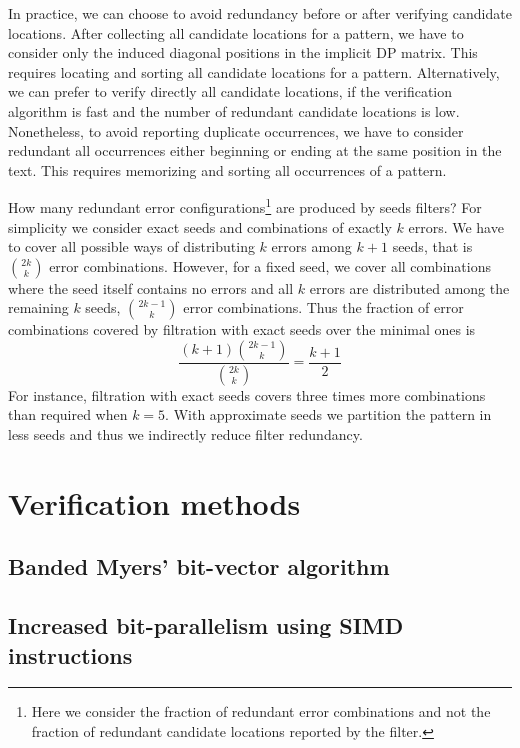 In practice, we can choose to avoid redundancy before or after verifying candidate locations.
After collecting all candidate locations for a pattern, we have to consider only the induced diagonal positions in the implicit DP matrix.
This requires locating and sorting all candidate locations for a pattern.
Alternatively, we can prefer to verify directly all candidate locations, \eg if the verification algorithm is fast and the number of redundant candidate locations is low.
Nonetheless, to avoid reporting duplicate occurrences, we have to consider redundant all occurrences either beginning or ending at the same position in the text.
This requires memorizing and sorting all occurrences of a pattern.

How many redundant error configurations\footnote{Here we consider the fraction of redundant error combinations and not the fraction of redundant candidate locations reported by the filter.} are produced by seeds filters?
For simplicity we consider exact seeds and combinations of exactly $k$ errors.
We have to cover all possible ways of distributing $k$ errors among $k+1$ seeds, that is $\binom{2k}{k}$ error combinations.
However, for a fixed seed, we cover all combinations where the seed itself contains no errors and all $k$ errors are distributed among the remaining $k$ seeds, \ie $\binom{2k-1}{k}$ error combinations.
Thus the fraction of error combinations covered by filtration with exact seeds over the minimal ones is
\begin{equation}
\frac{(k+1)\binom{2k-1}{k}}{\binom{2k}{k}} = \frac{k+1}{2}
\end{equation}
For instance, filtration with exact seeds covers three times more combinations than required when $k=5$.
With approximate seeds we partition the pattern in less seeds and thus we indirectly reduce filter redundancy.



\section{Verification methods}
\label{sec:verification}
\subsection{Banded Myers' bit-vector algorithm}
\subsection{Increased bit-parallelism using SIMD instructions}

